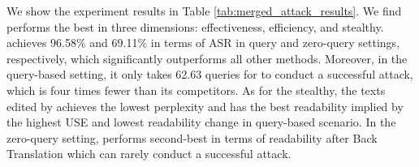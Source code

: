 We show the experiment results in Table \ref{tab:merged_attack_results}.
We find \attackname performs the best in three dimensions: effectiveness, efficiency, and stealthy.
\attackname achieves 96.58\% and 69.11\% in terms of ASR in query and zero-query settings, respectively, which significantly outperforms all other methods.
Moreover, in the query-based setting, it only takes 62.63 queries for \attackname to conduct a successful attack, which is four times fewer than its competitors.
As for the stealthy, the texts edited by \attackname achieves the lowest perplexity and has the best readability implied by the highest USE and lowest readability change in query-based scenario.
In the zero-query setting, \attackname performs second-best in terms of readability after Back Translation which can rarely conduct a successful attack.
